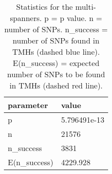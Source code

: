 \begin{table}

\caption{\label{tab:snp_stats}Statistics for the multi-spanners. p = p value. n = number of SNPs. n\_success = number of SNPs found in TMHs (dashed blue line). E(n\_success) = expected number of SNPs to be found in TMHs (dashed red line). }
\centering
\begin{tabular}[t]{l|l}
\hline
parameter & value\\
\hline
p & 5.796491e-13\\
\hline
n & 21576\\
\hline
n\_success & 3831\\
\hline
E(n\_success) & 4229.928\\
\hline
\end{tabular}
\end{table}